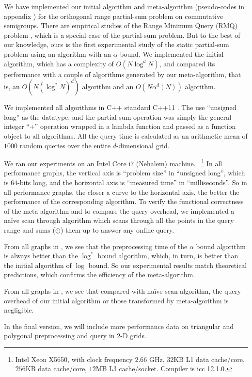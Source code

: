 

We have implemented our initial algorithm and meta-algorithm (pseudo-codes
in appendix  ) for the
orthogonal range partial-sum problem on commutative semigroups.
There are empirical studies of the Range Minimum Query (RMQ)
problem \cite{FischerHe06}, which is a special case of the partial-sum
problem. But to the best of our knowledge, ours is the first experimental
study of the static partial-sum problem using an algorithm with
an $\alpha$ bound. We implemented the initial algorithm, which has
a complexity of $O(N \log^d N)$, and compared its performance with a
couple of algorithms generated by our meta-algorithm, that is, an $O(N
(\log^* N)^d)$ algorithm and an $O(N \alpha^d (N))$ algorithm.

We implemented all algorithms in {C++} standard {C++11} \cite{C++11}.
The use ``unsigned long'' as the datatype, and the partial sum operation
was simply the general integer ``+'' operation wrapped in a lambda
function and passed as a function object to all algorithms. All the query
time is calculated as an arithmetic mean of $1000$ random queries over
the entire $d$-dimensional grid.

We ran our experiments on an Intel Core i7 (Nehalem) machine.
~\footnote{Intel Xeon X5650, with clock frequency $2.66$ GHz, $32$KB L1
data cache/core, $256$KB data cache/core, $12$MB L3 cache/socket. Compiler
is icc 12.1.0.} In all performance graphs, the vertical axis is ``problem
size'' in ``unsigned long'', which is $64$-bits long, and the horizontal
axis is ``measured time'' in ``milliseconds''.  So in all performance
graphs, the closer a curve to the horizontal axis, the better the
performance of the corresponding algorithm. To verify the functional
correctness of the meta-algorithm and to compare the query overhead,
we implemented a na\"ive scan through algorithm which scans through all
the points in the query range and sums ($\oplus$) them up to answer any
online query.

From all graphs in , we see that the preprocessing time
of the $\alpha$ bound algorithm is always better than the $\log^*$ bound
algorithm, which, in turn, is better than the initial algorithm of $\log$
bound. So our experimental results match theoretical predictions, which
confirms the efficiency of the meta-algorithm.

From all graphs in , we see that compared with
na\"ive scan algorithm, the query overhead of our initial algorithm or
those transformed by meta-algorithm is negligible. 

In the final version, we will include more performance data
on triangular and polygonal preprocessing and query in $2$-D grids.
